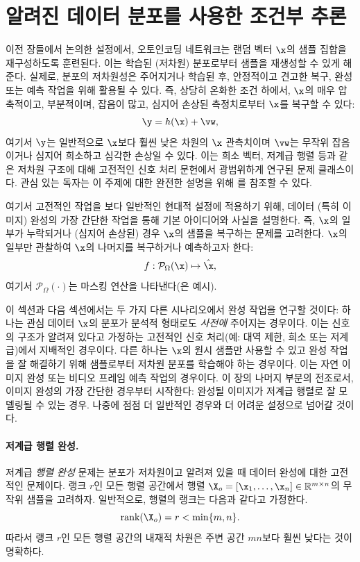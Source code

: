 \documentclass[../../book-main_ko.tex]{subfiles}
\begin{document}
\section{알려진 데이터 분포를 사용한 조건부 추론}
이전 장들에서 논의한 설정에서, 오토인코딩 네트워크는 랜덤 벡터 $\x$의 샘플 집합을 재구성하도록 훈련된다. 이는 학습된 (저차원) 분포로부터 샘플을 재생성할 수 있게 해준다. 실제로, 분포의 저차원성은 주어지거나 학습된 후, 안정적이고 견고한 복구, 완성 또는 예측 작업을 위해 활용될 수 있다. 즉, 상당히 온화한 조건 하에서, $\x$의 매우 압축적이고, 부분적이며, 잡음이 많고, 심지어 손상된 측정치로부터 $\x$를 복구할 수 있다:
\begin{equation}
    \y = h(\x) + \vw,
\end{equation}
여기서 $\y$는 일반적으로 $\x$보다 훨씬 낮은 차원의 $\x$ 관측치이며 $\vw$는 무작위 잡음이거나 심지어 희소하고 심각한 손상일 수 있다. 이는 희소 벡터, 저계급 행렬 등과 같은 저차원 구조에 대해 고전적인 신호 처리 문헌에서 광범위하게 연구된 문제 클래스이다. 관심 있는 독자는 이 주제에 대한 완전한 설명을 위해 \cite{Wright-Ma-2022}를 참조할 수 있다.

여기서 고전적인 작업을 보다 일반적인 현대적 설정에 적용하기 위해, 데이터 (특히 이미지) 완성의 가장 간단한 작업을 통해 기본 아이디어와 사실을 설명한다. 즉, $\x$의 일부가 누락되거나 (심지어 손상된) 경우 $\x$의 샘플을 복구하는 문제를 고려한다. $\x$의 일부만 관찰하여 $\x$의 나머지를 복구하거나 예측하고자 한다:
\begin{equation}
f: \mathcal{P}_{\Omega}(\x) \mapsto \hat{\x},
\end{equation}
여기서 $\mathcal{P}_{\Omega}(\cdot)$는 마스킹 연산을 나타낸다(은 예시).

이 섹션과 다음 섹션에서는 두 가지 다른 시나리오에서 완성 작업을 연구할 것이다: 하나는 관심 데이터 $\x$의 분포가 분석적 형태로도 {\em 사전에} 주어지는 경우이다. 이는 신호의 구조가 알려져 있다고 가정하는 고전적인 신호 처리(예: 대역 제한, 희소 또는 저계급)에서 지배적인 경우이다. 다른 하나는 $\x$의 원시 샘플만 사용할 수 있고 완성 작업을 잘 해결하기 위해 샘플로부터 저차원 분포를 학습해야 하는 경우이다. 이는 자연 이미지 완성 또는 비디오 프레임 예측 작업의 경우이다. 이 장의 나머지 부분의 전조로서, 이미지 완성의 가장 간단한 경우부터 시작한다: 완성될 이미지가 저계급 행렬로 잘 모델링될 수 있는 경우. 나중에 점점 더 일반적인 경우와 더 어려운 설정으로 넘어갈 것이다.

\paragraph{저계급 행렬 완성.}
저계급 {\em 행렬 완성} 문제는 분포가 저차원이고 알려져 있을 때 데이터 완성에 대한 고전적인 문제이다. 랭크 $r$인 모든 행렬 공간에서 행렬 $\X_o = [\x_1, \ldots, \x_n] \in \mathbb{R}^{m\times n}$의 무작위 샘플을 고려하자. 일반적으로, 행렬의 랭크는 다음과 같다고 가정한다.
\begin{equation}
\mbox{rank}(\X_o) = r < \min\{m, n\}.
\end{equation}
따라서 랭크 $r$인 모든 행렬 공간의 내재적 차원은 주변 공간 $mn$보다 훨씬 낮다는 것이 명확하다.
\end{document}
